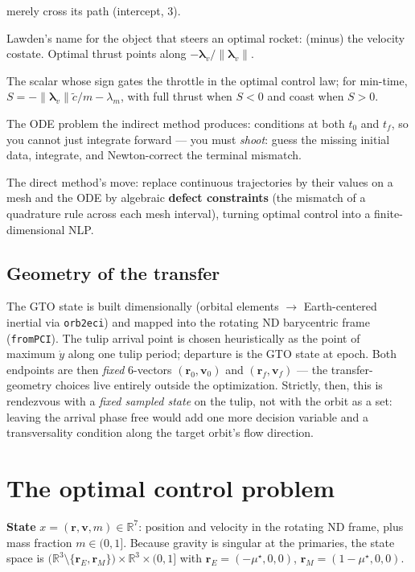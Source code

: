 \documentclass[11pt,letterpaper]{article}
\theoremstyle{noteplain}
\newcommand{\R}{\mathbb{R}}
\newcommand{\rvec}{\mathbf{r}}
\newcommand{\vvec}{\mathbf{v}}
\newcommand{\lamv}{\bm{\lambda}_v}
\newcommand{\lamm}{\lambda_m}
\newcommand{\code}[1]{\texttt{#1}}
\begin{document}
\begin{description}[leftmargin=1.6em,style=nextline]
  merely cross its path (intercept, 3).
  \item[Primer vector.] Lawden's name for the object that steers an optimal
  rocket: (minus) the velocity costate. Optimal thrust points along
  $-\lamv/\|\lamv\|$.
  \item[Switching function.] The scalar whose sign gates the throttle in the
  optimal control law; for min-time, $S = -\|\lamv\|\tilde c/m - \lamm$, with
  full thrust when $S<0$ and coast when $S>0$.
  \item[TPBVP (two-point boundary-value problem).] The ODE problem the
  indirect method produces: conditions at both $t_0$ and $t_f$, so you cannot
  just integrate forward --- you must \emph{shoot}: guess the missing initial
  data, integrate, and Newton-correct the terminal mismatch.
  \item[Transcription / defect.] The direct method's move: replace continuous
  trajectories by their values on a mesh and the ODE by algebraic
  \textbf{defect constraints} (the mismatch of a quadrature rule across each
  mesh interval), turning optimal control into a finite-dimensional NLP.
\end{description}

\subsection*{Geometry of the transfer}

The GTO state is built dimensionally (orbital elements $\to$ Earth-centered
inertial via \code{orb2eci}) and mapped into the rotating ND barycentric
frame (\code{fromPCI}). The tulip arrival point is chosen heuristically as
the point of maximum $\dot y$ along one tulip period; departure is the GTO
state at epoch. Both endpoints are then \emph{fixed} 6-vectors
$(\rvec_0,\vvec_0)$ and $(\rvec_f,\vvec_f)$ --- the transfer-geometry choices
live entirely outside the optimization. Strictly, then, this is rendezvous
with a \emph{fixed sampled state} on the tulip, not with the orbit as a set:
leaving the arrival phase free would add one more decision variable and a
transversality condition along the target orbit's flow direction.

\section{The optimal control problem}

\textbf{State} $x = (\rvec, \vvec, m) \in \R^7$: position and velocity in the
rotating ND frame, plus mass fraction $m \in (0,1]$. Because gravity is
singular at the primaries, the state space is
$\bigl(\R^3\setminus\{\rvec_E,\rvec_M\}\bigr)\times\R^3\times(0,1]$ with
$\rvec_E = (-\mu^\star,0,0)$, $\rvec_M = (1-\mu^\star,0,0)$.
\end{document}
